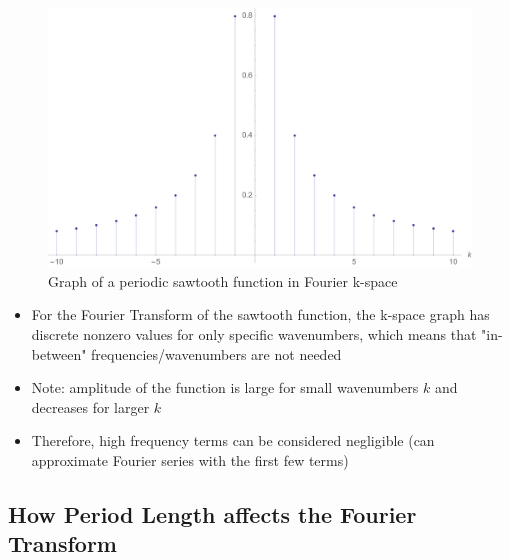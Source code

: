 \documentclass[a4paper,12pt]{article}
\begin{document}
\begin{figure}[H]
  \centering
  \includegraphics[width=140mm, scale=0.5]{images/sawtooth-k-space.pdf}
  \caption{Graph of a periodic sawtooth function in Fourier k-space}
  \label{Sawtooth-k-space}
\end{figure}

\begin{itemize}
  \item For the Fourier Transform of the sawtooth function, the k-space graph has discrete nonzero values for only specific wavenumbers, which means that "in-between" frequencies/wavenumbers are not needed
  \item Note: amplitude of the function is large for small wavenumbers $k$ and decreases for larger $k$
  \item Therefore, high frequency terms can be considered negligible (can approximate Fourier series with the first few terms)
\end{itemize}

\subsection{How Period Length affects the Fourier Transform}
\end{document}
